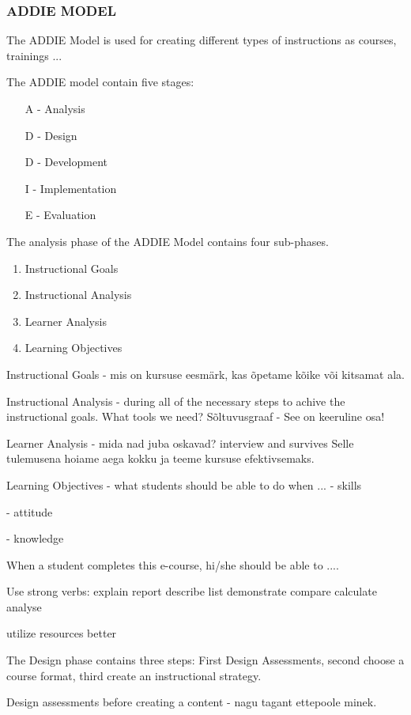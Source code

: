 \subsubsection{ADDIE MODEL}

The \gls{ADDIE Model} is used for creating different types of instructions as courses, trainings ...

The ADDIE model contain five stages:
\begin{itemize}
\item [A] - Analysis
\item [D] - Design
\item [D] - Development
\item [I] - Implementation
\item [E] - Evaluation
\end{itemize}

The analysis phase of the \gls{ADDIE Model} contains four sub-phases.
\begin{enumerate}
\item Instructional Goals
\item Instructional Analysis
\item Learner Analysis
\item Learning Objectives
\end{enumerate}

Instructional Goals - mis on kursuse eesmärk, kas õpetame kõike või kitsamat ala. 

Instructional Analysis - during all of the necessary steps to achive the instructional goals. What tools we need? Sõltuvusgraaf - See on keeruline osa!

Learner Analysis - mida nad juba oskavad? interview and survives Selle tulemusena hoiame aega kokku ja teeme kursuse efektivsemaks.

Learning Objectives - what students should be able to do when ...
- skills 

- attitude

- knowledge

When a student completes this e-course, hi/she should be able to ....

Use strong verbs:
explain
report
describe
list
demonstrate
compare
calculate
analyse

utilize resources better


The Design phase contains three steps: First Design Assessments, second choose a course format, third create an instructional strategy.

Design assessments before creating a content - nagu tagant ettepoole minek.

